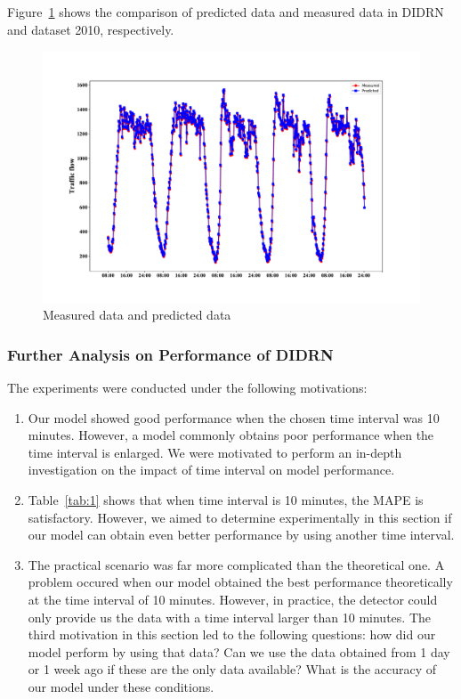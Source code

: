 \documentclass[twocolumn]{article}
\begin{document}
Figure~\ref{fig:measure} shows the comparison of predicted data and measured data in DIDRN and dataset 2010, respectively.
\begin{figure}[t]
    \centering
    \includegraphics[width=12cm]{Figure/pre.pdf}
    \caption{Measured data and predicted data}
    \label{fig:measure}
\end{figure}

\subsubsection{Further Analysis on Performance of DIDRN}\label{subsubsec:further}
\par
The experiments were conducted under the following motivations:
\begin{enumerate}[(1)]
    \item Our model showed good performance when the chosen time interval was 10 minutes. However, a model commonly obtains poor performance when the time interval is enlarged. We were motivated to perform an in-depth investigation on the impact of time interval on model performance.
    \item Table~\ref{tab:1} shows that when time interval is 10 minutes, the MAPE is satisfactory. However, we aimed to determine experimentally in this section if our model can obtain even better performance by using another time interval.
    \item The practical scenario was far more complicated than the theoretical one. A problem occured when our model obtained the best performance theoretically at the time interval of 10 minutes. However, in practice, the detector could only provide us the data with a time interval larger than 10 minutes. The third motivation in this section led to the following questions: how did our model perform by using that data? Can we use the data obtained from 1 day or 1 week ago if these are the only data available? What is the accuracy of our model under these conditions.
\end{enumerate}
\end{document}
